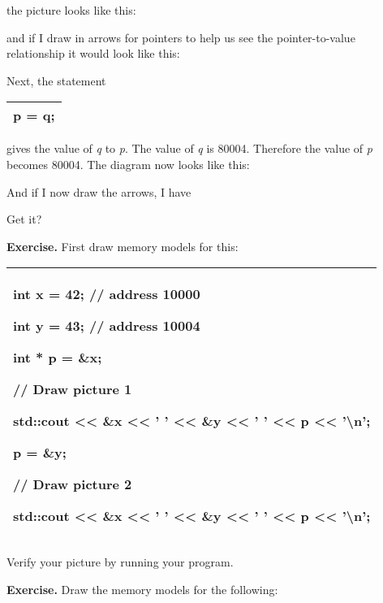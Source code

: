 \documentclass[
]{article}
\begin{document}
the picture looks like this:

and if I draw in arrows for pointers to help us see the pointer-to-value
relationship it would look like this:

Next, the statement

\begin{longtable}[]{@{}l@{}}
\toprule
\endhead
p = q;\tabularnewline
\bottomrule
\end{longtable}

gives the value of \emph{q} to \emph{p}. The value of \emph{q} is 80004.
Therefore the value of \emph{p} becomes 80004. The diagram now looks
like this:

And if I now draw the arrows, I have

Get it?

\textbf{Exercise.} First draw memory models for this:

\begin{longtable}[]{@{}l@{}}
\toprule
\endhead
\begin{minipage}[t]{0.97\columnwidth}\raggedright
int x = 42; // address 10000

int y = 43; // address 10004

int * p = \&x;

// Draw picture 1

std::cout \textless\textless{} \&x \textless\textless{} ' '
\textless\textless{} \&y \textless\textless{} ' ' \textless\textless{} p
\textless\textless{} '\textbackslash n';

p = \&y;

// Draw picture 2

std::cout \textless\textless{} \&x \textless\textless{} ' '
\textless\textless{} \&y \textless\textless{} ' ' \textless\textless{} p
\textless\textless{} '\textbackslash n';\strut
\end{minipage}\tabularnewline
\bottomrule
\end{longtable}

Verify your picture by running your program.

\textbf{Exercise.} Draw the memory models for the following:
\end{document}
